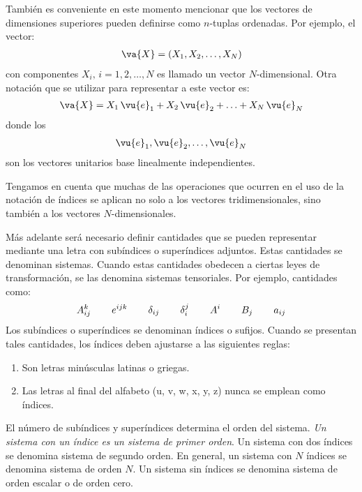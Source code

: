 \par
También es conveniente en este momento mencionar que los vectores de dimensiones superiores pueden definirse como $n$-tuplas ordenadas. Por ejemplo, el vector:
\begin{align*}
\va{X} = (X_{1}, X_{2}, \ldots, X_{N})
\end{align*}
con componentes $X_{i}, \, i =1, 2, \ldots, N$ es llamado un vector $N$-dimensional. Otra notación que se utilizar para representar a este vector es:
\begin{align*}
\va{X} = X_{1} \, \vu{e}_{1} +  X_{2} \, \vu{e}_{2} +  \ldots +  X_{N} \, \vu{e}_{N}
\end{align*}
donde los
\begin{align*}
\vu{e}_{1}, \vu{e}_{2}, \ldots, \vu{e}_{N}
\end{align*}
son los vectores unitarios base linealmente independientes.
\par
Tengamos en cuenta que muchas de las operaciones que ocurren en el uso de la notación de índices se aplican no solo a los vectores tridimensionales, sino también a los vectores $N$-dimensionales.
\par
Más adelante será necesario definir cantidades que se pueden representar mediante una letra con subíndices o superíndices adjuntos. Estas cantidades se denominan sistemas. Cuando estas cantidades obedecen a ciertas leyes de transformación, se las denomina sistemas tensoriales. Por ejemplo, cantidades como:
\begin{align*}
A_{ij}^{k} \hspace{0.75cm} e^{ijk} \hspace{0.75cm} \delta_{ij} \hspace{0.75cm} \delta_{i}^{j} \hspace{0.75cm} A^{i} \hspace{0.75cm} B_{j} \hspace{0.75cm} a_{ij}
\end{align*}
Los subíndices o superíndices se denominan índices o sufijos. Cuando se presentan tales cantidades, los índices deben ajustarse a las siguientes reglas:
\begin{enumerate}
\item Son letras minúsculas latinas o griegas.
\item Las letras al final del alfabeto (u, v, w, x, y, z) nunca se emplean como índices.
\end{enumerate}
El número de subíndices y superíndices determina el orden del sistema. \emph{Un sistema con un índice es un sistema de primer orden}. Un sistema con dos índices se denomina sistema de segundo orden. En general, un sistema con $N$ índices se denomina sistema de orden $N$. Un sistema sin índices se denomina sistema de orden escalar o de orden cero.
